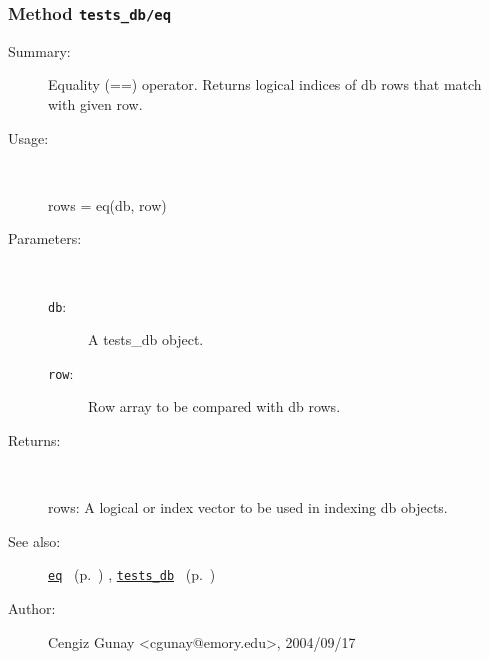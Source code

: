 \subsubsection[Method \texttt{eq}]{Method \texttt{tests\_db/eq}}%
%
\label{ref_tests_db__eq}%
\hypertarget{ref_tests_db__eq}{}%
\begin{description}
\item[Summary:]Equality (==) operator. Returns logical indices of db rows 
	that match with given row.
%
\item[Usage:]~%
\begin{lyxcode}%
rows = eq(db, row)
%
\end{lyxcode}%
%
%
\item[Parameters:]~
\begin{description}%
\item[\texttt{db}:]
 A tests\_db object.
\item[\texttt{row}:]
 Row array to be compared with db rows.
\end{description}%
%
\item[Returns:]~

	rows: A logical or index vector to be used in indexing db objects. 
%
%
\item[See also:]%
\hyperlink{ref_eq}{\texttt{eq}}%
\ (p.~\pageref{ref_eq})%
%
, \hyperlink{ref_tests_db}{\texttt{tests\_db}}%
\ (p.~\pageref{ref_tests_db})%
%
%
\item[Author:]%
Cengiz Gunay <cgunay@emory.edu>, 2004/09/17%
\end{description}
\methodline%
